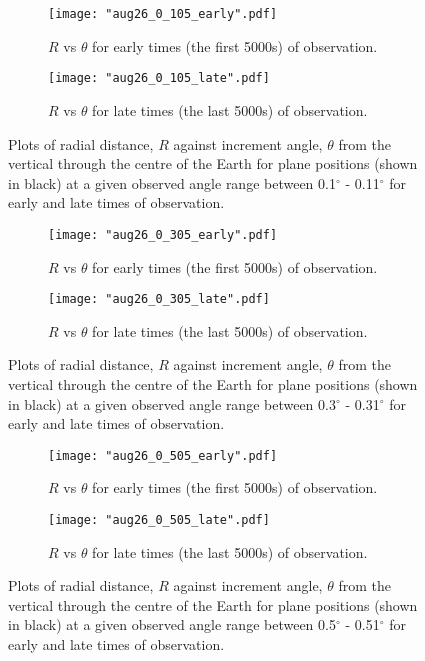 \documentclass{article}
\begin{document}
\begin{figure}
\centering
\begin{subfigure}{.5\textwidth}
  \centering
  \texttt{[image: "aug26\_0\_105\_early".pdf]}
  \caption{$R$ vs $\theta$ for early times (the first 5000s) of observation.}
  \label{fig:sub1}
\end{subfigure}%
\begin{subfigure}{.5\textwidth}
  \centering
  \texttt{[image: "aug26\_0\_105\_late".pdf]}
  \caption{$R$ vs $\theta$ for late times (the last 5000s) of observation.}
  \label{fig:sub2}
\end{subfigure}
\caption{Plots of radial distance, $R$ against increment angle, $\theta$ from the vertical through the centre of the Earth for plane positions (shown in black) at a given observed angle range between 0.1$^{\circ}$ - 0.11$^{\circ}$ for early and late times of observation.}
\label{fig:phi0_0.105}
\end{figure}

\begin{figure}
\centering
\begin{subfigure}{.5\textwidth}
  \centering
  \texttt{[image: "aug26\_0\_305\_early".pdf]}
  \caption{$R$ vs $\theta$ for early times (the first 5000s) of observation.}
  \label{fig:sub3}
\end{subfigure}%
\begin{subfigure}{.5\textwidth}
  \centering
  \texttt{[image: "aug26\_0\_305\_late".pdf]}
  \caption{$R$ vs $\theta$ for late times (the last 5000s) of observation.}
  \label{fig:sub4}
\end{subfigure}
\caption{Plots of radial distance, $R$ against increment angle, $\theta$ from the vertical through the centre of the Earth for plane positions (shown in black) at a given observed angle range between 0.3$^{\circ}$ - 0.31$^{\circ}$ for early and late times of observation.}
\label{fig:phi0_0.305}
\end{figure}

\clearpage
\begin{figure}
\centering
\begin{subfigure}{.5\textwidth}
  \centering
  \texttt{[image: "aug26\_0\_505\_early".pdf]}
  \caption{$R$ vs $\theta$ for early times (the first 5000s) of observation.}
  \label{fig:sub5}
\end{subfigure}%
\begin{subfigure}{.5\textwidth}
  \centering
  \texttt{[image: "aug26\_0\_505\_late".pdf]}
  \caption{$R$ vs $\theta$ for late times (the last 5000s) of observation.}
  \label{fig:sub6}
\end{subfigure}
\caption{Plots of radial distance, $R$ against increment angle, $\theta$ from the vertical through the centre of the Earth for plane positions (shown in black) at a given observed angle range between 0.5$^{\circ}$ - 0.51$^{\circ}$ for early and late times of observation.}
\label{fig:phi0_0.505}
\end{figure}
\end{document}
